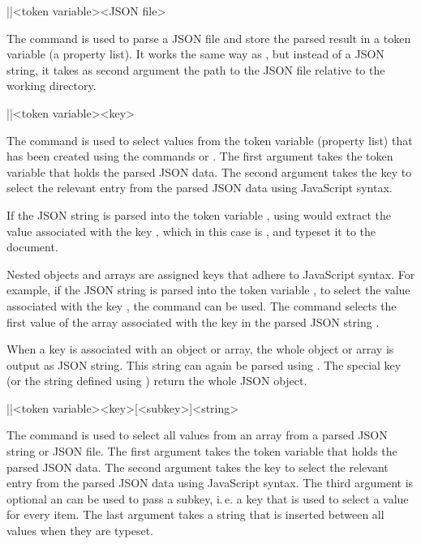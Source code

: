 \documentclass[a4paper]{article}
\begin{document}
{{\begin{macrodef}
|\JSONParseFromFile|{<token variable>}{<JSON file>}
\end{macrodef}
The command \macro{\JSONParseFromFile} is used to parse a JSON file and store the parsed result in a token variable (a property list). It works the same way as \macro{\JSONParse}, but instead of a JSON string, it takes as second argument the path to the JSON file relative to the working directory.

\begin{macrodef}
|\JSONParseGetValue|{<token variable>}{<key>}
\end{macrodef}
The command \macro{\JSONParseGetValue} is used to select values from the token variable (property list) that has been created using the commands \macro{\JSONParse} or \macro{\JSONParseFromFile}. The first argument takes the token variable that holds the parsed JSON data. The second argument takes the key to select the relevant entry from the parsed JSON data using JavaScript syntax.

If the JSON string  is parsed into the token variable \macro{\myJSONdata}, using  would extract the value associated with the key , which in this case is , and typeset it to the document.

Nested objects and arrays are assigned keys that adhere to JavaScript syntax. For example, if the JSON string  is parsed into the token variable \macro{\myJSONdata}, to select the value associated with the key , the command  can be used. The command  selects the first value of the array associated with the key  in the parsed JSON string .

When a key is associated with an object or array, the whole object or array is output as JSON string. This string can again be parsed using \macro{\JSONParse}. The special key  (or the string defined using \macro{\JSONParseSetChildSeparator}) return the whole JSON object.

\begin{macrodef}
|\JSONParseGetArrayValues|{<token variable>}{<key>}[<subkey>]{<string>}
\end{macrodef}
The command \macro{\JSONParseGetArrayValues} is used to select all values from an array from a parsed JSON string or JSON file. The first argument takes the token variable that holds the parsed JSON data. The second argument takes the key to select the relevant entry from the parsed JSON data using JavaScript syntax. The third argument is optional an can be used to pass a subkey, i.\,e. a key that is used to select a value for every item. The last argument takes a string that is inserted between all values when they are typeset.

}}
\end{document}
